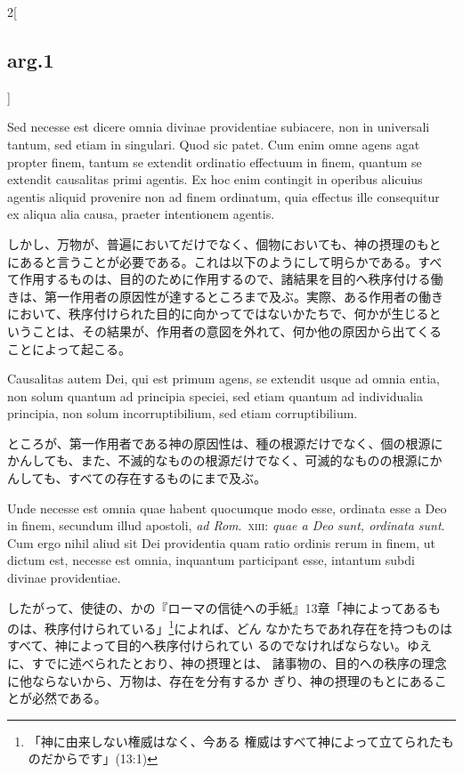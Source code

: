 \documentclass[paper=a4paper,fontsize=10pt,jafontsize=9pt,titlepage]{jlreq}
\begin{document}
\begin{paracol}{2}[\subsection{arg.1}]
\switchcolumn*

Sed necesse est dicere omnia divinae providentiae
subiacere, non in universali tantum, sed etiam in singulari. Quod sic
patet. Cum enim omne agens agat propter finem, tantum se extendit
ordinatio effectuum in finem, quantum se extendit causalitas primi
agentis. 
Ex hoc enim contingit in operibus alicuius agentis aliquid
provenire non ad finem ordinatum, quia effectus ille consequitur ex
aliqua alia causa, praeter intentionem agentis.

\switchcolumn

しかし、万物が、普遍においてだけでなく、個物においても、神の摂理のもと
にあると言うことが必要である。これは以下のようにして明らかである。すべ
て作用するものは、目的のために作用するので、諸結果を目的へ秩序付ける働
きは、第一作用者の原因性が達するところまで及ぶ。実際、ある作用者の働き
において、秩序付けられた目的に向かってではないかたちで、何かが生じると
いうことは、その結果が、作用者の意図を外れて、何か他の原因から出てくる
ことによって起こる。

\switchcolumn*

Causalitas autem Dei,
qui est primum agens, se extendit usque ad omnia entia, non solum
quantum ad principia speciei, sed etiam quantum ad individualia
principia, non solum incorruptibilium, sed etiam corruptibilium.

\switchcolumn

ところが、第一作用者である神の原因性は、種の根源だけでなく、個の根源に
かんしても、また、不滅的なものの根源だけでなく、可滅的なものの根源にか
んしても、すべての存在するものにまで及ぶ。

\switchcolumn*

Unde
necesse est omnia quae habent quocumque modo esse, ordinata esse a Deo
in finem, secundum illud apostoli, {\itshape ad Rom}.~{\scshape xiii}: {\itshape quae a Deo sunt,
ordinata sunt}. Cum ergo nihil aliud sit Dei providentia quam ratio
ordinis rerum in finem, ut dictum est, necesse est omnia, inquantum
participant esse, intantum subdi divinae providentiae.

\switchcolumn

したがって、使徒の、かの『ローマの信徒への手紙』13章「神によってあるも
のは、秩序付けられている」\footnote{「神に由来しない権威はなく、今ある
権威はすべて神によって立てられたものだからです」(13:1)}によれば、どん
なかたちであれ存在を持つものはすべて、神によって目的へ秩序付けられてい
るのでなければならない。ゆえに、すでに述べられたとおり、神の摂理とは、
諸事物の、目的への秩序の理念に他ならないから、万物は、存在を分有するか
ぎり、神の摂理のもとにあることが必然である。


\end{paracol}
\end{document}
